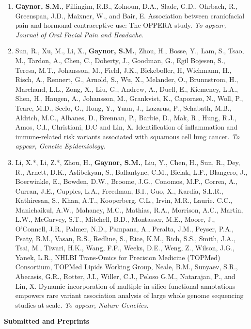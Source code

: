 \documentclass[10pt]{article}
\begin{document}
\begin{enumerate}
\item \textbf{Gaynor, S.M.}, Fillingim, R.B., Zolnoun, D.A., Slade, G.D., Ohrbach, R., Greenspan, J.D., Maixner, W.,  and Bair, E. Association between craniofacial pain and hormonal contraceptive use: The OPPERA study. \textit{To appear, Journal of Oral Facial Pain and Headache.}
\item Sun, R., Xu, M., Li, X., \textbf{Gaynor, S.M.}, Zhou, H., Bosse, Y., Lam, S., Tsao, M., Tardon, A., Chen, C., Doherty, J., Goodman, G., Egil Bojesen, S., Teresa, M.T., Johansson, M., Field, J.K., Bickeboller, H, Wichmann, H., Risch, A., Rennert, G., Arnold, S., Wu, X., Melander, O., Brunnstrom, H.,
Marchand, L.L., Zong, X., Liu, G., Andrew, A., Duell, E., Kiemeney, L.A., Shen, H., Haugen, A.,
Johansson, M., Grankvist, K., Caporaso, N., Woll, P., Teare, M.D., Scelo, G., Hong, Y., Yuan, J.,
Lazarus, P., Schabath, M.B., Aldrich, M.C., Albanes, D., Brennan, P., Barbie, D., Mak, R., Hung,
R.J., Amos, C.I., Christiani, D.C and Lin, X. Identification of inflammation and immune-related risk variants associated with squamous cell lung cancer. \textit{To appear, Genetic Epidemiology.}
\item Li, X.*, Li, Z.*, Zhou, H., \textbf{Gaynor, S.M.}, Liu, Y., Chen, H., Sun, R., Dey, R., Arnett, D.K., Aslibekyan, S., Ballantyne, C.M., Bielak, L.F., Blangero, J., Boerwinkle, E., Bowden, D.W., Broome, J.G., Conomos, M.P., Correa, A., Curran, J.E., Cupples, L.A., Freedman, B.I.,  Guo, X., Kardia, S.L.R., Kathiresan, S., Khan, A.T.,  Kooperberg, C.L., Irvin, M.R., Laurie. C.C., Manichaikul, A.W., Mahaney, M.C., Mathias, R.A., Morrison, A.C., Martin, L.W., McGarvey, S.T., Mitchell, B.D., Montasser, M.E.,  Moore, J.,  O’Connell, J.R., Palmer, N.D., Pampana, A.,  Peralta, J.M.,  Peyser, P.A.,  Psaty, B.M., Vasan, R.S., Redline, S., Rice, K.M., Rich, S.S., Smith, J.A.,  Tsai, M., Tiwari, H.K., Wang, F.F., Weeks, D.E., Weng, Z., Wilson, J.G., Yanek, L.R., NHLBI Trans-Omics for Precision Medicine (TOPMed) Consortium, TOPMed Lipids Working Group, Neale, B.M., Sunyaev, S.R., Abecasis, G.R.,  Rotter, J.I.,  Willer, C.J., Peloso G.M., Natarajan, P., and Lin, X. Dynamic incorporation of multiple in-silico functional annotations empowers rare variant association analysis of large whole genome sequencing studies at scale. \textit{To appear, Nature Genetics.}\\
\end{enumerate}

\vspace{0.2cm}

\indent \textbf{Submitted and Preprints} \\
\end{document}
